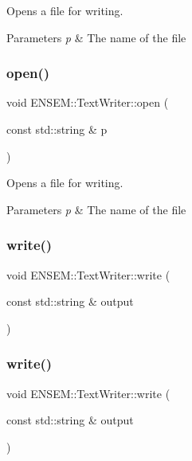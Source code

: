 Opens a file for writing. 
\begin{DoxyParams}{Parameters}
{\em p} & The name of the file \\
\hline
\end{DoxyParams}
\mbox{\label{classENSEM_1_1TextWriter_a8a7bdd80e930dd002d3af693e5a2cb95}} 
\subsubsection{\texorpdfstring{open()}{open()}\hspace{0.1cm}{\footnotesize\ttfamily [3/3]}}
{\footnotesize\ttfamily void E\+N\+S\+E\+M\+::\+Text\+Writer\+::open (\begin{DoxyParamCaption}\item[{const std\+::string \&}]{p }\end{DoxyParamCaption})}

Opens a file for writing. 
\begin{DoxyParams}{Parameters}
{\em p} & The name of the file \\
\hline
\end{DoxyParams}
\mbox{\label{classENSEM_1_1TextWriter_a46f85ca8047ad9b0419c1f8e40847b52}} 
\subsubsection{\texorpdfstring{write()}{write()}\hspace{0.1cm}{\footnotesize\ttfamily [1/36]}}
{\footnotesize\ttfamily void E\+N\+S\+E\+M\+::\+Text\+Writer\+::write (\begin{DoxyParamCaption}\item[{const std\+::string \&}]{output }\end{DoxyParamCaption})}

\mbox{\label{classENSEM_1_1TextWriter_a46f85ca8047ad9b0419c1f8e40847b52}} 
\subsubsection{\texorpdfstring{write()}{write()}\hspace{0.1cm}{\footnotesize\ttfamily [2/36]}}
{\footnotesize\ttfamily void E\+N\+S\+E\+M\+::\+Text\+Writer\+::write (\begin{DoxyParamCaption}\item[{const std\+::string \&}]{output }\end{DoxyParamCaption})}

